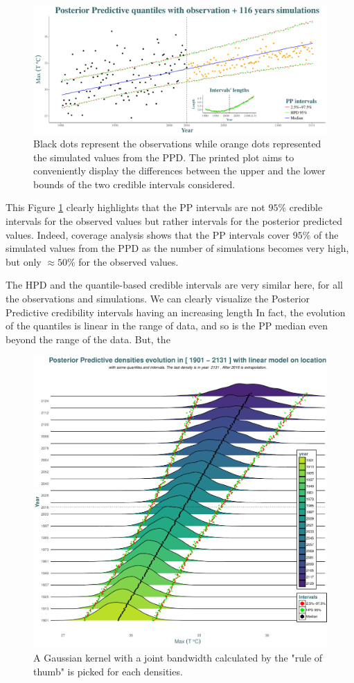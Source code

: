  \begin{figure}[!htb]
 	\centering	\includegraphics[width=0.9\linewidth]{ppd.pdf}\caption{Black dots represent the observations while orange dots represented the simulated values from the PPD. The printed plot aims to conveniently display the differences between the upper and the lower bounds of the two credible intervals considered.}\label{fig:ppd}
 \end{figure}
 
 This Figure \ref{fig:ppd} clearly highlights that the PP intervals are not $95\%$ credible intervals for the observed values but rather intervals for the posterior predicted values. Indeed, coverage analysis shows that the PP intervals cover $95\%$ of the simulated values from the PPD as the number of simulations becomes very high, but only $\approx 50\%$ for the observed values.
 
 
 The HPD and the quantile-based credible intervals are very similar here, for all the observations and simulations. 
 We can clearly visualize the Posterior Predictive credibility intervals having an increasing length  
 In fact, the evolution of the quantiles is linear in the range of data, and so is the PP median even beyond the range of the data. But, the 


 \begin{figure}[!htb]
  	\centering	\includegraphics[width=0.8\linewidth]{predpred.pdf}\caption{A Gaussian kernel with a joint bandwidth calculated by the \citet[pp.48, (3.31)]{silverman_1986} "rule of thumb" is picked for each densities.}\label{fig:post_pred}
 \end{figure}
  
